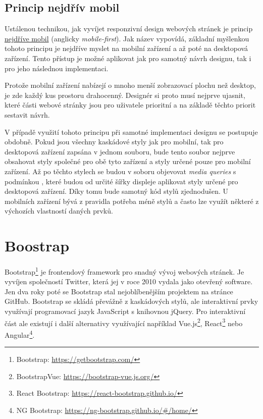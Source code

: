 \subsection{Princip nejdřív mobil}\label{section:mobile-first}
Ustálenou technikou, jak vyvíjet responzivní design webových stránek je princip \ul{nejdříve mobil} (anglicky \emph{mobile-first}). Jak název vypovídá, základní myšlenkou tohoto principu je nejdříve myslet na mobilní zařízení a až poté na desktopová zařízení. Tento přístup je možné aplikovat jak pro samotný návrh designu, tak i pro jeho následnou implementaci.

Protože mobilní zařízení nabízejí o mnoho menší zobrazovací plochu než desktop, je zde každý kus prostoru drahocenný. Designér si proto musí nejprve ujasnit, které části webové stránky jsou pro uživatele prioritní a na základě těchto priorit sestavit návrh.

V případě využití tohoto principu při samotné implementaci designu se postupuje obdobně. Pokud jsou všechny kaskádové styly jak pro mobilní, tak pro desktopová zařízení zapsána v jednom souboru, bude tento soubor nejprve obsahovat styly společné pro obě tyto zařízení a styly určené pouze pro mobilní zařízení. Až po těchto stylech se budou v soboru objevovat \emph{media queries} s podmínkou , které budou od určité šířky displeje aplikovat styly určené pro desktopová zařízení. Díky tomu bude samotný kód stylů zjednodušen. U mobilních zařízení bývá z pravidla potřeba méně stylů a často lze využít některé z výchozích vlastností daných prvků.


\section{Boostrap}
Bootstrap\footnote{Bootstrap: \url{https://getbootstrap.com/}} je frontendový framework pro snadný vývoj webových stránek. Je vyvíjen společností Twitter, která jej v roce 2010 vydala jako otevřený software. Jen dva roky poté se Bootstrap stal nejoblíbenějším projektem na stránce GitHub. Bootstrap se skládá převážně z kaskádových stylů, ale interaktivní prvky využívají programovací jazyk JavaScript s knihovnou jQuery. Pro interaktivní část ale existují i další alternativy využívající například Vue.js\footnote{BootstrapVue: \url{https://bootstrap-vue.js.org/}}, React\footnote{React Bootstrap: \url{https://react-bootstrap.github.io/}} nebo Angular\footnote{NG Bootstrap: \url{https://ng-bootstrap.github.io/#/home/}}.

